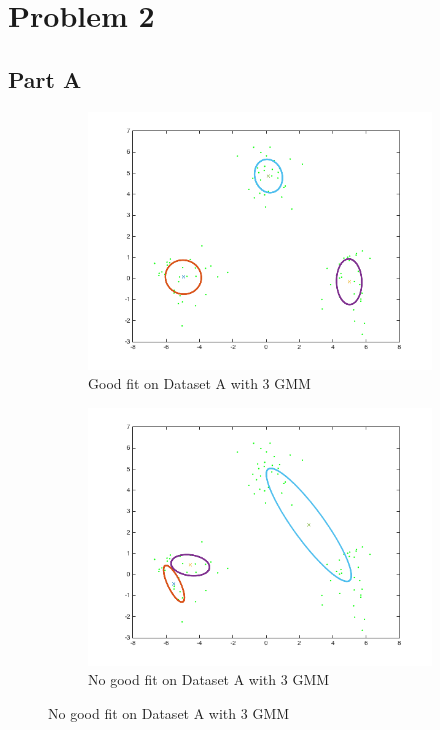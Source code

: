 \section*{Problem 2}
\subsection*{Part A}
\begin{figure}[ht]
\begin{subfigure}[b]{0.5\linewidth}
    \centering
    \includegraphics[width=0.75\linewidth]{figures/mixmodelA_3_20.png}
    \caption{Good fit on Dataset A with 3 GMM}
    \vspace{4ex}
  \end{subfigure}%
  \begin{subfigure}[b]{0.5\linewidth}
  \centering
\includegraphics[width=0.75\linewidth]{figures/mixmodelA_3_500.png}
\caption{No good fit on Dataset A with 3 GMM}
\vspace{4ex}
\end{subfigure}%
\end{figure}

